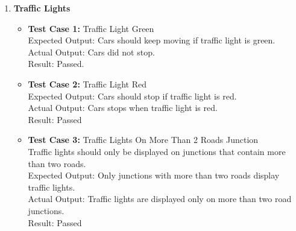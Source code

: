 \documentclass[11pt, oneside]{article}   	%
\begin{document}
\begin{itemize}
\begin{enumerate}
\item \textbf{Traffic Lights}
\begin{itemize}
\item \textbf{Test Case 1:} Traffic Light Green \hfill \\
Expected Output:
Cars should keep moving if traffic light is green.\hfill \\
Actual Output:
Cars did not stop.\hfil \\
Result:
Passed.
\item \textbf{Test Case 2:} Traffic Light Red\hfill \\
 Expected Output: Cars should stop if traffic light is red.\hfill \\
 Actual Output: Cars stops when traffic light is red.\hfill \\
 Result: Passed
 
 \item \textbf{Test Case 3:} Traffic Lights On More Than 2 Roads Junction\hfill \\
 Traffic lights should only be displayed on junctions that contain more than two roads.\hfill \\
 Expected Output: Only junctions with more than two roads display traffic lights.\hfill \\
 Actual Output: Traffic lights are displayed only on more than two road junctions.\hfill \\
 Result: Passed
\end{itemize}


\end{enumerate}
\end{itemize}
\end{document}
